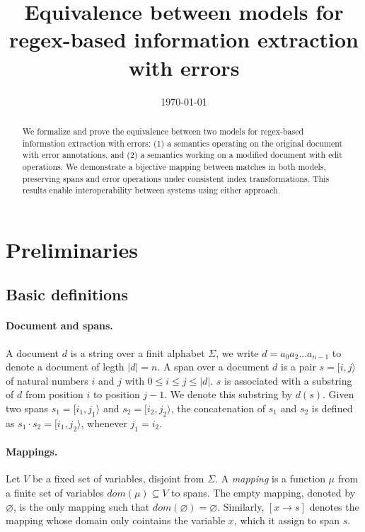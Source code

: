 \documentclass{article}
\title{Equivalence between models for regex-based information extraction with errors}
\date{\today}
\begin{document}
\maketitle

\begin{abstract}
We formalize and prove the equivalence between two models for regex-based information extraction with errors: (1) a semantics operating on the original document with error annotations, and (2) a semantics working on a modified document with edit operations. We demonstrate a bijective mapping between matches in both models, preserving spans and error operations under consistent index transformations. This results enable interoperability between systems using either approach.
\end{abstract}

\section{Preliminaries}

\subsection{Basic definitions}

\paragraph{Document and spans.} A document $d$ is a string over a finit alphabet $\Sigma$, we write $d= a_0a_2...a_{n-1}$ to denote a document of legth $|d| = n$. A span over a document $d$ is a pair $s = [i, j\rangle$ of natural numbers $i$ and $j$ with $0 \leq i \leq j \leq |d|$. $s$ is associated with a substring of $d$ from position $i$ to position $j-1$. We denote this substring by $d(s)$. Given two spans $s_1 = [i_1, j_1\rangle$ and $s_2 = [i_2, j_2\rangle$, the concatenation of $s_1$ and $s_2$ is defined as $s_1 \cdot s_2 = [i_1, j_2\rangle$, whenever $j_1 = i_2$.

\paragraph{Mappings.} Let $V$ be a fixed set of variables, disjoint from $\Sigma$. A \textit{mapping} is a function $\mu$ from a finite set of variables $dom(\mu) \subseteq V$ to spans. The empty mapping, denoted by $\varnothing$, is the only mapping such that $dom(\varnothing) = \varnothing$. Similarly, $[x \xrightarrow{} s]$ denotes the mapping whose domain only cointains the variable $x$, which it assign to span $s$.
\end{document}
